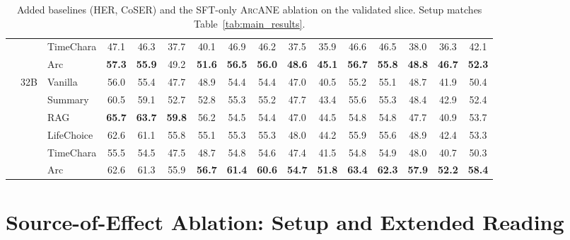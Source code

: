 \documentclass[11pt]{article}
\newcommand{\ours}{\textsc{ArcANE}}
\begin{document}
\begin{table}[!htbp]
\begin{tabular}{lllccccccccccccc}
 &  & TimeChara & 47.1 & 46.3 & 37.7 & 40.1 & 46.9 & 46.2 & 37.5 & 35.9 & 46.6 & 46.5 & 38.0 & 36.3 & 42.1 \\
 &  & \cellcolor{yellow!15} Arc & \cellcolor{yellow!15} \textbf{57.3} & \cellcolor{yellow!15} \textbf{55.9} & \cellcolor{yellow!15} 49.2 & \cellcolor{yellow!15} \textbf{51.6} & \cellcolor{yellow!15} \textbf{56.5} & \cellcolor{yellow!15} \textbf{56.0} & \cellcolor{yellow!15} \textbf{48.6} & \cellcolor{yellow!15} \textbf{45.1} & \cellcolor{yellow!15} \textbf{56.7} & \cellcolor{yellow!15} \textbf{55.8} & \cellcolor{yellow!15} \textbf{48.8} & \cellcolor{yellow!15} \textbf{46.7} & \cellcolor{yellow!15} \textbf{52.3} \\
\cmidrule(l){2-16}
 & \multirow[t]{6}{*}{32B} & Vanilla & 56.0 & 55.4 & 47.7 & 48.9 & 54.4 & 54.4 & 47.0 & 40.5 & 55.2 & 55.1 & 48.7 & 41.9 & 50.4 \\
 &  & Summary & 60.5 & 59.1 & 52.7 & 52.8 & 55.3 & 55.2 & 47.7 & 43.4 & 55.6 & 55.3 & 48.4 & 42.9 & 52.4 \\
 &  & RAG & \textbf{65.7} & \textbf{63.7} & \textbf{59.8} & 56.2 & 54.5 & 54.4 & 47.0 & 44.5 & 54.8 & 54.8 & 47.7 & 40.9 & 53.7 \\
 &  & LifeChoice & 62.6 & 61.1 & 55.8 & 55.1 & 55.3 & 55.3 & 48.0 & 44.2 & 55.9 & 55.6 & 48.9 & 42.4 & 53.3 \\
 &  & TimeChara & 55.5 & 54.5 & 47.5 & 48.7 & 54.8 & 54.6 & 47.4 & 41.5 & 54.8 & 54.9 & 48.0 & 40.7 & 50.3 \\
 &  & \cellcolor{yellow!15} Arc & \cellcolor{yellow!15} 62.6 & \cellcolor{yellow!15} 61.3 & \cellcolor{yellow!15} 55.9 & \cellcolor{yellow!15} \textbf{56.7} & \cellcolor{yellow!15} \textbf{61.4} & \cellcolor{yellow!15} \textbf{60.6} & \cellcolor{yellow!15} \textbf{54.7} & \cellcolor{yellow!15} \textbf{51.8} & \cellcolor{yellow!15} \textbf{63.4} & \cellcolor{yellow!15} \textbf{62.3} & \cellcolor{yellow!15} \textbf{57.9} & \cellcolor{yellow!15} \textbf{52.2} & \cellcolor{yellow!15} \textbf{58.4} \\
\bottomrule
\end{tabular}
\caption{Added baselines (HER, CoSER) and the SFT-only \ours{} ablation on the validated slice. Setup matches Table~\ref{tab:main_results}.}
\label{tab:main_results_added}
\end{table}


\section{Source-of-Effect Ablation: Setup and Extended Reading\label{app:arc-ablation-extra}}
\end{document}
